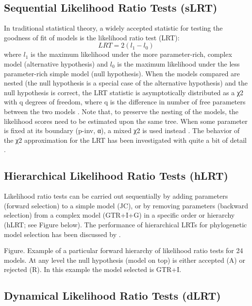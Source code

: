 \subsection{Sequential Likelihood Ratio Tests (sLRT)}
\label{sec:slrt}

In traditional statistical theory, a widely accepted statistic for testing the goodness of fit of models is the likelihood ratio test (LRT): 
\[
LRT=2(l_1-l_0)
\]
where $l_1$ is the maximum likelihood under the more parameter-rich, complex model (alternative hypothesis) and $l_0$ is the maximum likelihood under the less parameter-rich simple model (null hypothesis).
 When the models compared are nested (the null hypothesis is a special case of the alternative hypothesis) and the null hypothesis is correct, the LRT statistic is asymptotically distributed as a χ2 with q degrees of freedom, where q is the difference in number of free parameters between the two models \citep{Kendall-1979, Goldman-1993b}. Note that, to preserve the nesting of the models, the likelihood scores need to be estimated upon the same tree. When some parameter is fixed at its boundary (p-inv, α), a mixed χ2 is used instead \citep{Ohta-1992, Goldman-2000}. The behavior of the χ2 approximation for the LRT has been investigated with quite a bit of detail \citep{Goldman-1993a, Goldman-1993b, Yang-1995, Whelan-1999, Goldman-2000}.

\subsection{Hierarchical Likelihood Ratio Tests (hLRT)}
\label{sec:hlrt}

Likelihood ratio tests can be carried out sequentially by adding parameters (forward selection) to a simple model (JC), or by removing parameters (backward selection) from a complex model (GTR+I+G) in a specific order or hierarchy (hLRT; see Figure below). The performance of hierarchical LRTs for phylogenetic model selection has been discussed by \citet{Posada-2004}.


Figure. Example of a particular forward hierarchy of likelihood ratio tests for 24 models. At any level the null hypothesis (model on top) is either accepted (A) or rejected (R). In this example the model selected is GTR+I.

\subsection{Dynamical Likelihood Ratio Tests (dLRT)}
\label{sec:dlrt}

